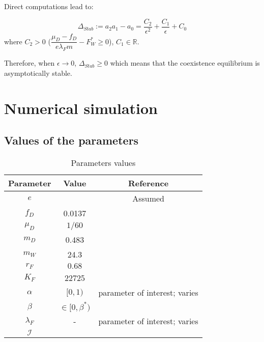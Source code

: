 \documentclass{article}
\newcommand{\lfw}{\lambda_{F}}
\newcommand{\lfw}{\lambda_{F}}
\begin{document}
Direct computations lead to:

\begin{equation*}
\Delta_{Stab} := a_2 a_1 - a_0 = \dfrac{C_2}{\epsilon^2} + \dfrac{C_1}{\epsilon} + C_0
\end{equation*}
where $C_2 > 0$ ($\dfrac{\mu_D -f_D}{e\lfw m} - F_W^* \geq 0$), $C_1 \in \mathbb{R}$.


Therefore, when $\epsilon \rightarrow 0$, $\Delta_{Stab} \geq 0$ which means that the coexistence equilibrium is asymptotically stable.









\section{Numerical simulation}

\subsection{Values of the parameters}

\begin{table}[ht]
\centering
\begin{tabular}{|c|c|c|}
\hline 
Parameter & Value & Reference \\ 
\hline 
$e$ & & Assumed\\
$f_D$ & 0.0137 & \cite{koppert_consommation_1996}\\
$\mu_D$ & $1/60$ & \cite{ins_demographie}\\
$m_D$ & 0.483 & \cite{avila_interpreting_2019}\\
$m_W$ & 24.3 & \cite{avila_interpreting_2019}\\
$r_F$ & $0.68$ & \cite{robinson_intrinsic_1986}\\
$K_F$ & 22725 & \cite{janson_ecological_1990} \\
$\alpha$ & $[0, 1)$ & parameter of interest; varies \\
$\beta$ & $\in [0, \beta^*)$ &  \\
$\lfw$ & - & parameter of interest; varies \\
$\mathcal{I}$ &  & \\
\hline
\end{tabular}
\caption{Parameters values}
\end{table}
\end{document}
